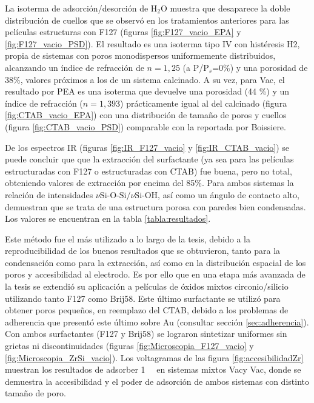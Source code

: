 		 La isoterma de adsorción/desorción de H$_2$O muestra que desaparece la doble distribución de cuellos que se observó en los tratamientos anteriores para las películas estructuras con F127 (figuras \ref{fig:F127_vacio_EPA} y \ref{fig:F127_vacio_PSD}). El resultado es una isoterma tipo IV con histéresis H2, propia de sistemas con poros monodispersos uniformemente distribuidos, alcanzando un índice de refracción de $n=1,25$ (a P/P$_s$=0\%) y una porosidad de $38\%$, valores próximos a los de un sistema calcinado. A su vez, para Vac\pdmC, el resultado por PEA es una isoterma que devuelve una porosidad (44 \%) y un índice de refracción ($n=1,393$) prácticamente igual al del calcinado (figura \ref{fig:CTAB_vacio_EPA}) con una distribución de tamaño de poros y cuellos (figura \ref{fig:CTAB_vacio_PSD}) comparable con la reportada por Boissiere\cite{Boissiere2005}.

		 De los espectros IR  (figuras \ref{fig:IR_F127_vacio} y \ref{fig:IR_CTAB_vacio}) se puede concluir que que la extracción del surfactante (ya sea para las películas estructuradas con F127 o estructuradas con CTAB) fue buena, pero no total, obteniendo valores de extracción por encima del 85\%. Para ambos sistemas la relación de intensidades $\nu{\text{Si-O-Si/}}\nu{\text{Si-OH}}$, así como un ángulo de contacto alto, demuestran que se trata de una estructura porosa con paredes bien condensadas. Los valores se encuentran en la tabla \ref{tabla:resultados}.

		 Este método fue el más utilizado a lo largo de la tesis, debido a la reproducibilidad de los buenos resultados que se obtuvieron, tanto para la condensación como para la extracción, así como en la distribución espacial de los poros y accesibilidad al electrodo. Es por ello que en una etapa más avanzada de la tesis se extendió su aplicación a películas de óxidos mixtos circonio/silicio utilizando tanto F127 como Brij58. Este último surfactante se utilizó para obtener poros pequeños, en reemplazo del CTAB, debido a los problemas de adherencia que presentó este último sobre Au (consultar sección \ref{sec:adherencia}). Con ambos surfactantes (F127 y Brij58) se lograron sintetizar \pdm\space uniformes sin grietas ni discontinuidades (figuras \ref{fig:Microscopia_F127_vacio} y \ref{fig:Microscopia_ZrSi_vacio}). Los voltagramas de las figura \ref{fig:accesibilidadZr} muestran los resultados de adsorber \aminorutenio\space \SI{1}{\milli\Molar} en sistemas mixtos Vac\pdmZ\space y Vac\pdmZB, donde se demuestra la accesibilidad y el poder de adsorción de ambos sistemas con distinto tamaño de poro.

